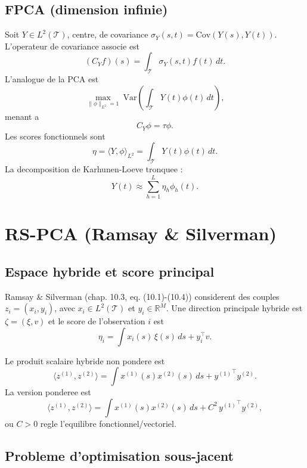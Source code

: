 \documentclass[11pt,a4paper]{article}
\begin{document}
\subsection{FPCA (dimension infinie)}

Soit $Y\in L^2(\mathcal{T})$, centre, de covariance
$\sigma_Y(s,t)=\mathrm{Cov}(Y(s),Y(t))$. L'operateur de covariance associe est
\[
(C_Y f)(s)=\int_{\mathcal{T}}\sigma_Y(s,t)f(t)\,dt.
\]
L'analogue de la PCA est
\[
\max_{\|\phi\|_{L^2}=1}\ \mathrm{Var}\!\left(\int_{\mathcal{T}}Y(t)\phi(t)\,dt\right),
\]
menant a
\[
C_Y\phi=\tau\phi.
\]
Les scores fonctionnels sont
\[
\eta=\langle Y,\phi\rangle_{L^2}=\int_{\mathcal{T}}Y(t)\phi(t)\,dt.
\]
La decomposition de Karhunen-Loeve tronquee :
\[
Y(t)\approx \sum_{h=1}^L\eta_h\phi_h(t).
\]

\section{RS-PCA (Ramsay \& Silverman)}
\label{sec:rs}

\subsection{Espace hybride et score principal}

Ramsay \& Silverman (chap. 10.3, eq. (10.1)-(10.4)) considerent des couples
$z_i=(x_i,y_i)$, avec $x_i\in L^2(\mathcal{T})$ et $y_i\in\mathbb{R}^M$.
Une direction principale hybride est $\zeta=(\xi,v)$ et le score de
l'observation $i$ est
\begin{equation}
\eta_i=\int x_i(s)\,\xi(s)\,ds + y_i^\top v.
\label{eq:rs-score}
\end{equation}

Le produit scalaire hybride non pondere est
\begin{equation}
\langle z^{(1)}, z^{(2)} \rangle
=\int x^{(1)}(s)x^{(2)}(s)\,ds + {y^{(1)}}^\top y^{(2)}.
\label{eq:rs-inner}
\end{equation}
La version ponderee est
\begin{equation}
\langle z^{(1)}, z^{(2)} \rangle
=\int x^{(1)}(s)x^{(2)}(s)\,ds + C^2\,{y^{(1)}}^\top y^{(2)},
\label{eq:rs-inner-weighted}
\end{equation}
ou $C>0$ regle l'equilibre fonctionnel/vectoriel.

\subsection{Probleme d'optimisation sous-jacent}
\end{document}
